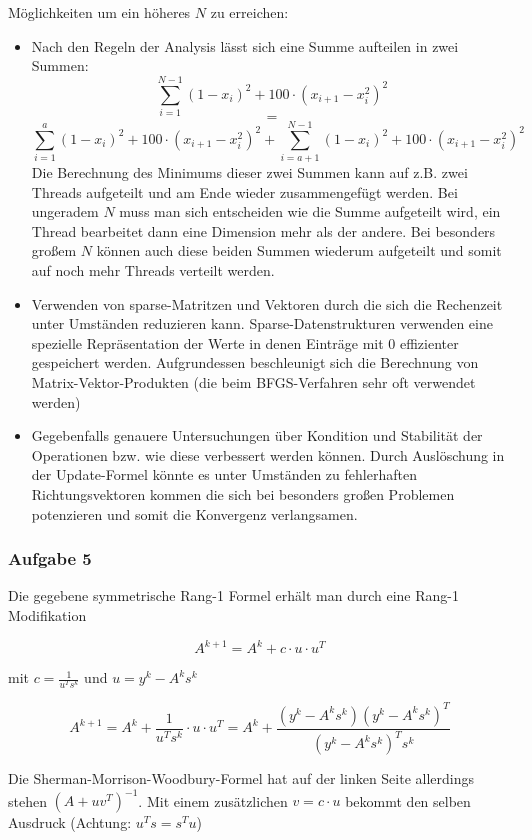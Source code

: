 \documentclass[a4paper, 12pt]{report}
\begin{document}
Möglichkeiten um ein höheres $N$ zu erreichen:
\begin{itemize}
  \item Nach den Regeln der Analysis lässt sich eine Summe aufteilen in zwei Summen:
  $$\sum_{i=1}^{N-1}(1 - x_i)^2 + 100\cdot(x_{i+1}-x_i^2)^2$$
  $$=$$
  $$\sum_{i=1}^{a}(1 - x_i)^2 + 100\cdot(x_{i+1}-x_i^2)^2 + \sum_{i=a+1}^{N-1}(1 - x_i)^2 + 100\cdot(x_{i+1}-x_i^2)^2$$
  Die Berechnung des Minimums dieser zwei Summen kann auf z.B. zwei Threads aufgeteilt und am Ende wieder zusammengefügt werden.
  Bei ungeradem $N$ muss man sich entscheiden wie die Summe aufgeteilt wird, ein Thread bearbeitet dann eine Dimension mehr als der andere.
  Bei besonders großem $N$ können auch diese beiden Summen wiederum aufgeteilt und somit auf noch mehr Threads verteilt werden.
  \item Verwenden von sparse-Matritzen und Vektoren durch die sich die Rechenzeit unter Umständen reduzieren kann. Sparse-Datenstrukturen
  verwenden eine spezielle Repräsentation der Werte in denen Einträge mit $0$ effizienter gespeichert werden. Aufgrundessen beschleunigt
  sich die Berechnung von Matrix-Vektor-Produkten (die beim BFGS-Verfahren sehr oft verwendet werden)
  \item Gegebenfalls genauere Untersuchungen über Kondition und Stabilität der Operationen bzw. wie diese verbessert werden können.
  Durch Auslöschung in der Update-Formel könnte es unter Umständen zu fehlerhaften Richtungsvektoren kommen die sich bei besonders
  großen Problemen potenzieren und somit die Konvergenz verlangsamen.
\end{itemize}

\subsubsection{Aufgabe 5}

Die gegebene symmetrische Rang-1 Formel erhält man durch eine Rang-1 Modifikation

$$A^{k + 1} = A^k + c\cdot u\cdot u^T$$

mit $c = \frac{1}{u^Ts^k}$ und $u = y^k - A^ks^k$

$$A^{k+1} = A^k + \frac{1}{u^Ts^k}\cdot u \cdot u^T = A^k + \frac{(y^k - A^ks^k)(y^k - A^ks^k)^T}{(y^k - A^ks^k)^Ts^k}$$
 
Die Sherman-Morrison-Woodbury-Formel hat auf der linken Seite allerdings stehen $(A + uv^T)^{-1}$. Mit einem zusätzlichen $v = c\cdot u$
bekommt den selben Ausdruck (Achtung: $u^Ts = s^Tu$)
\end{document}
